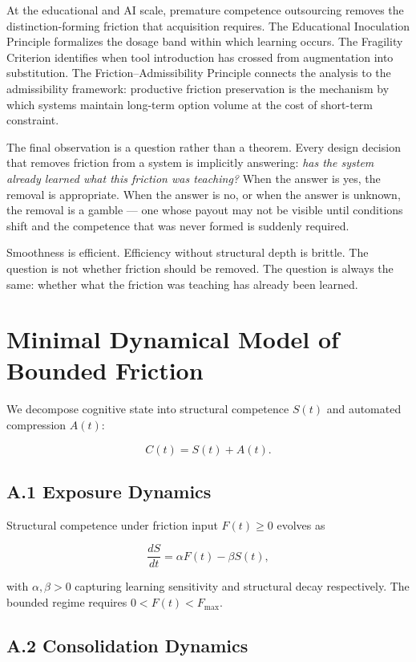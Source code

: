 \documentclass[11pt]{article}
\theoremstyle{remark}
\begin{document}
At the educational and AI scale, premature competence outsourcing removes the distinction-forming friction that acquisition requires. The Educational Inoculation Principle formalizes the dosage band within which learning occurs. The Fragility Criterion identifies when tool introduction has crossed from augmentation into substitution. The Friction--Admissibility Principle connects the analysis to the admissibility framework: productive friction preservation is the mechanism by which systems maintain long-term option volume at the cost of short-term constraint.

The final observation is a question rather than a theorem. Every design decision that removes friction from a system is implicitly answering: \emph{has the system already learned what this friction was teaching?} When the answer is yes, the removal is appropriate. When the answer is no, or when the answer is unknown, the removal is a gamble --- one whose payout may not be visible until conditions shift and the competence that was never formed is suddenly required.

Smoothness is efficient. Efficiency without structural depth is brittle. The question is not whether friction should be removed. The question is always the same: whether what the friction was teaching has already been learned.


\appendix

\section{Minimal Dynamical Model of Bounded Friction}
\label{app:dynamics}

We decompose cognitive state into structural competence $S(t)$ and automated compression $A(t)$:

\[
C(t) = S(t) + A(t).
\]

\subsection*{A.1 Exposure Dynamics}

Structural competence under friction input $F(t) \geq 0$ evolves as

\[
\frac{dS}{dt} = \alpha F(t) - \beta S(t),
\]

with $\alpha, \beta > 0$ capturing learning sensitivity and structural decay respectively. The bounded regime requires $0 < F(t) < F_{\max}$.

\subsection*{A.2 Consolidation Dynamics}
\end{document}

